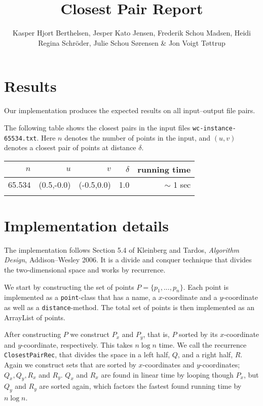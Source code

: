 \documentclass{tufte-handout}
\title{Closest Pair Report}
\author{Kasper Hjort Berthelsen, Jesper Kato Jensen, Frederik Schou Madsen, Heidi Regina Schröder, Julie Schou Sørensen  \& Jon Voigt Tøttrup}
\begin{document}
  \maketitle
  

  \section{Results}

  Our implementation produces the expected results on all input--output file pairs. %

The following table shows the closest pairs in the input files {\tt wc-instance-65534.txt}.
Here $n$ denotes the number of points in the input,
and $(u,v)$ denotes a closest pair of points at distance $\delta$.

  \bigskip\noindent
  \begin{tabular}{rrrrr}\toprule
    $n$ & $u$ & $v$ & $\delta$ & running time \\\midrule
    65.534 & (0.5,-0.0) & (-0.5,0.0) & 1.0 & $\sim$ 1 sec \\
\\\bottomrule
  \end{tabular}

  \section{Implementation details}
The implementation follows Section 5.4 of Kleinberg and Tardos, \emph{Algorithm Design}, Addison--Wesley 2006. It is a divide and conquer technique that divides the two-dimensional space and works by recurrence. 

We start by constructing the set of points $P=\{ p_1, ..., p_n\}$. Each point is implemented as a \verb#point#-class that has a name, a $x$-coordinate and a $y$-coordinate as well as a \verb#distance#-method. The total set of points is then implemented as an ArrayList of points.

After constructing $P$ we construct $P_x$ and $P_y$, that is, $P$ sorted by its $x$-coordinate and $y$-coordinate, respectively. This takes $n\log n$ time. We call the recurrence \verb#ClosestPairRec#, that divides the space in a left half, $Q$, and a right half, $R$. Again we construct sets that are sorted by $x$-coordinates and $y$-coordinates; $Q_x, Q_y, R_x$ and $R_y$. $Q_x$ and $R_x$ are found in linear time by looping though $P_x$, but $Q_y$ and $R_y$ are sorted again, which factors the fastest found running time by $n\log n$. 
\end{document}
